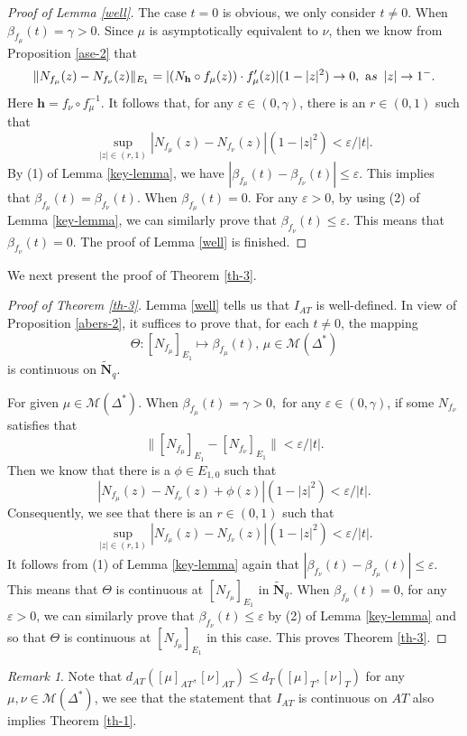 \documentclass[11pt]{amsart}
\theoremstyle{remark}
\newtheorem{remark}[theorem]{Remark}
\theoremstyle{claim}
\theoremstyle{definition}
\theoremstyle{problem}
\theoremstyle{conjecture}
\theoremstyle{question}
\numberwithin{equation}{section}
\begin{document}
\begin{proof}[Proof of Lemma \ref{well}]
The case $t=0$ is obvious, we only consider $t\neq 0$.  When $\beta_{f_{\mu}}(t)=\gamma >0$.
Since $\mu$ is asymptotically equivalent to $\nu$, then we  know from Proposition \ref{ase-2} that
\begin{eqnarray}
\|N_{f_{\mu}}(z)-N_{f_{\nu}}(z)\|_{E_1}=|(N_{\mathbf{h}}\circ f_{\mu}(z))\cdot f'_{\mu}(z)|(1-|z|^2)\rightarrow 0,\,\, {\text as}\,\,\, |z| \rightarrow 1^{-}. \nonumber
\end{eqnarray}
Here $\mathbf{h}=f_{\nu}\circ f_{\mu}^{-1}$.  It follows that, for any $\varepsilon\in (0, \gamma)$, there is an $r\in (0,1)$ such that  $$\sup\limits_{|z|\in (r, 1)}|N_{f_{\mu}}(z)-N_{f_{\nu}}(z)|(1-|z|^2) <\varepsilon/|t|.$$
By (1) of Lemma \ref{key-lemma}, we have $|\beta_{f_{\mu}}(t)-\beta_{f_{\nu}}(t)|\leq \varepsilon.$ This implies that $\beta_{f_{\mu}}(t)=\beta_{f_{\nu}}(t)$.
When $\beta_{f_{\mu}}(t)=0$. For any $\varepsilon>0$, by using (2) of Lemma \ref{key-lemma}, we can similarly prove that $\beta_{f_{\nu}}(t)\leq \varepsilon.$ This means that $\beta_{f_{\nu}}(t)=0$.
The proof of Lemma \ref{well} is finished.
\end{proof}

We next present the proof of Theorem \ref{th-3}.
\begin{proof}[Proof of Theorem \ref{th-3}]
Lemma \ref{well} tells us that $I_{AT}$ is well-defined. In view of Proposition \ref{abers-2}, it suffices to prove that, for each $t\neq0$, the mapping
$$\Theta: [N_{f_{\mu}}]_{E_1}  \mapsto \beta_{f_{\mu}}(t),\, \mu\in \mathcal{M}(\Delta^{*})$$ is continuous on $\widetilde{\mathbf{N}}_q$.

For given $\mu \in \mathcal{M}(\Delta^{*})$.  When $\beta_{f_{\mu}}(t)=\gamma>0,$ for any $\varepsilon\in (0, \gamma)$, if some $N_{f_{\nu}}$ satisfies that
$$\|[N_{f_{\mu}}]_{E_1}-[N_{f_{\nu}}]_{E_1}\| < \varepsilon/|t|.$$
Then we know that there is a $\phi \in E_{1,0}$ such that
$$|N_{f_{\mu}}(z)-N_{f_{\nu}}(z)+\phi(z)|(1-|z|^2)< \varepsilon/|t|. $$
Consequently, we see that there is an $r\in (0,1)$ such that
$$\sup\limits_{|z|\in (r,1)}|N_{f_{\mu}}(z)-N_{f_{\nu}}(z)|(1-|z|^2)< \varepsilon/|t|.$$
It follows from (1) of Lemma \ref{key-lemma} again that $|\beta_{f_{\nu}}(t)-\beta_{f_{\mu}}(t)|\leq \varepsilon.$ This means that $\Theta$ is continuous at $[N_{f_{\mu}}]_{E_1}$ in $\widetilde{\mathbf{N}}_q$.  When $\beta_{f_{\mu}}(t)=0$, for any $\varepsilon>0$, we can similarly prove that $\beta_{f_{\nu}}(t)\leq \varepsilon$ by (2) of Lemma \ref{key-lemma} and so that $\Theta$ is continuous at $[N_{f_{\mu}}]_{E_1}$ in this case. This proves Theorem \ref{th-3}.
\end{proof}
\begin{remark}
Note that $d_{AT}([\mu]_{AT}, [\nu]_{AT}) \leq d_{T}([\mu]_T, [\nu]_T)$ for any $\mu, \nu \in \mathcal{M}(\Delta^{*})$, we see that the statement that $I_{AT}$ is continuous on $AT$ also implies Theorem \ref{th-1}.
\end{remark}
\end{document}
